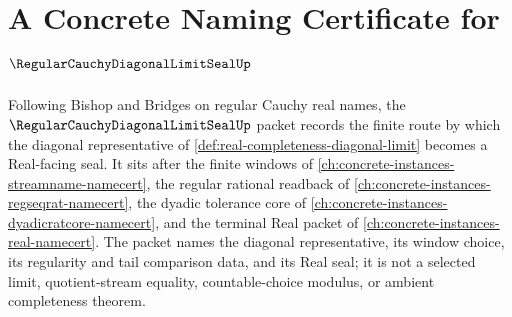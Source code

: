 \chapter{A Concrete Naming Certificate for $\RegularCauchyDiagonalLimitSealUp$}
\label{ch:concrete-instances-regular-cauchy-diagonal-limit-seal-namecert}

Following Bishop and Bridges on regular Cauchy real names, the $\RegularCauchyDiagonalLimitSealUp$ packet records the finite route by which the diagonal representative of \autoref{def:real-completeness-diagonal-limit} becomes a Real-facing seal. It sits after the finite windows of \autoref{ch:concrete-instances-streamname-namecert}, the regular rational readback of \autoref{ch:concrete-instances-regseqrat-namecert}, the dyadic tolerance core of \autoref{ch:concrete-instances-dyadicratcore-namecert}, and the terminal Real packet of \autoref{ch:concrete-instances-real-namecert}. The packet names the diagonal representative, its window choice, its regularity and tail comparison data, and its Real seal; it is not a selected limit, quotient-stream equality, countable-choice modulus, or ambient completeness theorem.

